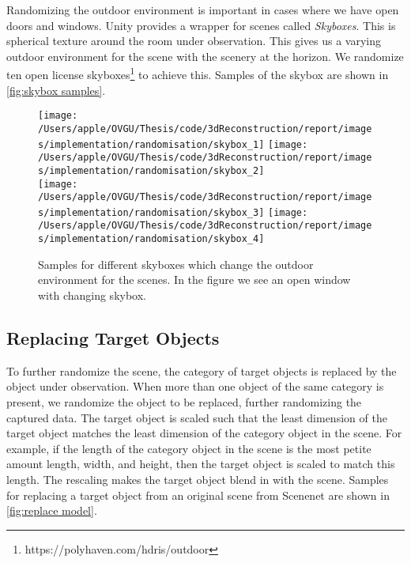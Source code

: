Randomizing the outdoor environment is important in cases where we have open doors and windows.
Unity provides a wrapper for scenes called \emph{Skyboxes}.
This is spherical texture around the room under observation.
This gives us a varying outdoor environment for the scene with the scenery at the horizon.
We randomize ten open license skyboxes\footnote{https://polyhaven.com/hdris/outdoor} to achieve this.
Samples of the skybox are shown in \autoref{fig:skybox samples}.


\begin{figure}
    \centering
    \texttt{[image: /Users/apple/OVGU/Thesis/code/3dReconstruction/report/images/implementation/randomisation/skybox\_1]}
    \texttt{[image: /Users/apple/OVGU/Thesis/code/3dReconstruction/report/images/implementation/randomisation/skybox\_2]} \\
    \vspace{0.1cm}
    \texttt{[image: /Users/apple/OVGU/Thesis/code/3dReconstruction/report/images/implementation/randomisation/skybox\_3]}
    \texttt{[image: /Users/apple/OVGU/Thesis/code/3dReconstruction/report/images/implementation/randomisation/skybox\_4]}\\
    \caption[Samples for Skyboxes.]{Samples for different skyboxes which change the outdoor environment for the scenes. In the figure we see an open window with changing skybox.}
    \label{fig:skybox samples}
\end{figure}



\subsection{Replacing Target Objects}\label{subsec:replacing-target-objects}

To further randomize the scene, the category of target objects is replaced by the object under observation.
When more than one object of the same category is present, we randomize the object to be replaced, further randomizing the captured data.
The target object is scaled such that the least dimension of the target object matches the least dimension of the category object in the scene.
For example, if the length of the category object in the scene is the most petite amount length, width, and height, then the target object is scaled to match this length.
The rescaling makes the target object blend in with the scene.
Samples for replacing a target object from an original scene from Scenenet are shown in \autoref{fig:replace model}.

